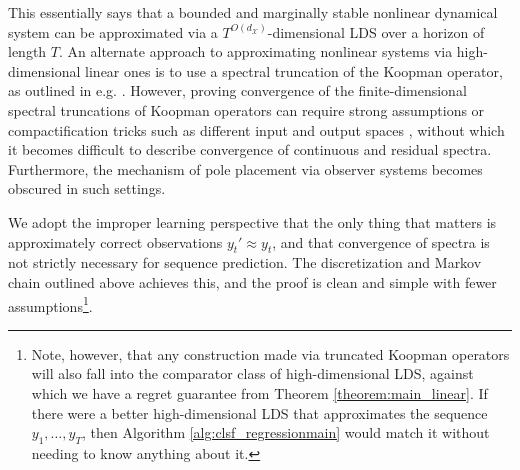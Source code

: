 \documentclass[11pt]{article}
\newcommand{\evannote}[1]{\textcolor{red}{\{evan: #1\}}}
\numberwithin{equation}{section}
\begin{document}
This essentially says that a bounded and marginally stable nonlinear dynamical system can be approximated via a $T^{O(d_\mathcal{X})}$-dimensional LDS over a horizon of length $T$. 
An alternate approach to approximating nonlinear systems via high-dimensional linear ones is to use a spectral truncation of the Koopman operator, as outlined in e.g. \cite{brunton2021modernkoopmantheorydynamical}. However, 
proving convergence of the finite-dimensional spectral truncations of Koopman operators can require strong assumptions or compactification tricks such as different input and output spaces \cite{IEEEkoopmandifferentspaces}, without which 
it becomes difficult to describe convergence of continuous and residual spectra. Furthermore, the mechanism of pole placement via observer systems becomes obscured in such settings.

We adopt the improper learning perspective that the only thing that matters is approximately correct observations $y_t' \approx y_t$, and that convergence of spectra is not strictly necessary for sequence prediction. The discretization and Markov chain outlined above achieves this, and the proof is clean and simple with fewer assumptions\footnote{Note, however, that any construction made via truncated Koopman operators will also fall into the comparator class of high-dimensional LDS, against which we have a regret guarantee from Theorem \ref{theorem:main_linear}. If there were a better high-dimensional LDS that approximates the sequence $y_1, \ldots, y_T$, then Algorithm \ref{alg:clsf_regressionmain} would match it without needing to know anything about it.}. 
\end{document}
